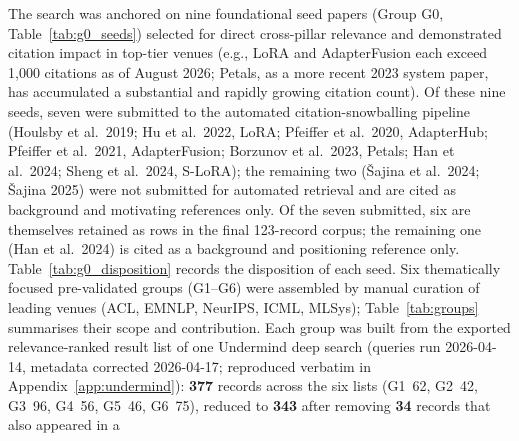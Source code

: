 The search was anchored on nine foundational seed papers (Group G0,
Table~\ref{tab:g0_seeds}) selected
for direct cross-pillar relevance and demonstrated citation impact in
top-tier venues (e.g., LoRA and AdapterFusion each exceed 1,000 citations as
of August 2026; Petals, as a more recent 2023 system paper, has accumulated a
substantial and rapidly growing citation count). %
Of these nine seeds, seven were submitted to the automated
citation-snowballing pipeline (Houlsby et al.\ 2019; Hu et al.\ 2022, LoRA;
Pfeiffer et al.\ 2020, AdapterHub; Pfeiffer et al.\ 2021, AdapterFusion;
Borzunov et al.\ 2023, Petals; Han et al.\ 2024; Sheng et al.\ 2024, S-LoRA);
the remaining two ({\v{S}}ajina et al.\ 2024; {\v{S}}ajina 2025) were not
submitted for automated retrieval and are cited as background and
motivating references only. \sloppy Of the seven submitted, six are themselves retained
as rows in the final 123-record corpus; the remaining one (Han et al.\ 2024) is
cited as a background and positioning reference only.
Table~\ref{tab:g0_disposition} records the
disposition of each seed. Six thematically focused
pre-validated groups (G1--G6) were assembled
by manual curation of leading venues (ACL, EMNLP, NeurIPS, ICML, MLSys);
Table~\ref{tab:groups} summarises their scope and contribution. Each group
was built from the exported relevance-ranked result list of one Undermind
deep search (queries run 2026-04-14, metadata corrected 2026-04-17;
reproduced verbatim in Appendix~\ref{app:undermind}): \textbf{377} records
across the six lists (G1~62, G2~42, G3~96, G4~56, G5~46, G6~75), reduced to
\textbf{343} after removing \textbf{34} records that also appeared in a
